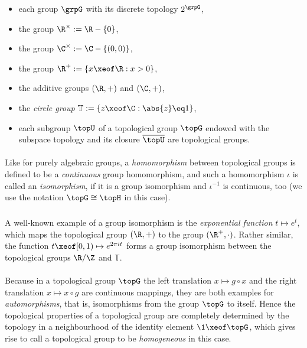 \documentclass[11pt,twoside]{article}
\begin{document}
\begin{itemize}[leftmargin=12pt]
\item[1.]
each group $\grpG$ with its discrete topology $2^{\grpG}$,

\item[2.]
the group $\R^{\times} := \R - \{0\}$,

\item[3.]
the group $\C^{\times} := \C - \{(0,0)\}$,

\item[4.]
the group $\R^+ := \{x \xeof \R: x >0\}$,

\item[5.]
the additive groups $(\R,+)$ and $(\C,+)$,

\item[6.]
the \textit{circle group} $\mathbb{T} := \{z \xeof \C: \abs{z} \eq 1 \}$,

\item[7.]
each subgroup $\topU$ of a topological group $\topG$
endowed with the subspace topology
and its closure $\overline{\topU}$ are topological groups.
\end{itemize}

\paragraph{}
Like for purely algebraic groups,
a \textit{homomorphism} between topological groups
is defined to be a \textit{continuous} group homomorphism,
and such a homomorphism $\iota$ is called an \textit{isomorphism},
if it is a group isomorphism and $\iota^{-1}$ is continuous,
too
(we use the notation $\topG \cong \topH$ in this case).

\subparagraph{} %
A well-known example of a group isomorphism is
the \textit{exponential function} $t \mapsto e^{t}$,
which maps the topological group $(\R,+)$ to the group $(\R^+,\cdot)$.
Rather similar,
the function
$t \xeof [0,1) \mapsto e^{2 \pi it}$
forms a group isomorphism between the topological groups
$\R / \Z$ and $\mathbb{T}$.

\paragraph{} %
Because in a topological group $\topG$
the left  translation $x \mapsto g \circ x$ and
the right translation $x \mapsto x \circ g$
are continuous mappings,
they are both examples for \textit{automorphisms},
that is,
isomorphisms from the group $\topG$ to itself.
Hence the topological properties of a topological group
are completely determined by the topology in a neighbourhood
of the identity element $\1 \xeof \topG$,
which gives rise to call a topological group to be \textit{homogeneous}
in this case.
\end{document}
